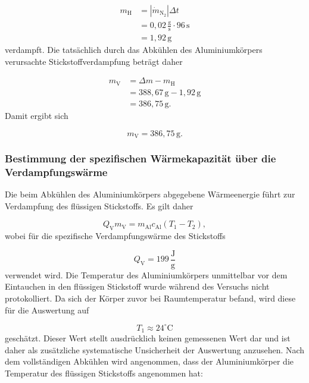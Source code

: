 \documentclass{report}
\begin{document}
\begin{align}
m_\mathrm{H}
&=
\left|\dot m_\mathrm{N_2}\right|\Delta t\\
&=
0{,}02\,\mathrm{\frac{g}{s}}
\cdot96\,\mathrm{s}\\
&=
1{,}92\,\mathrm{g}
\end{align}
\noindent
verdampft.
\noindent
Die tatsächlich durch das Abkühlen des Aluminiumkörpers verursachte
Stickstoffverdampfung beträgt daher

\begin{align}
m_\mathrm{V}
&=
\Delta m-m_\mathrm{H}\\
&=
388{,}67\,\mathrm{g}
-
1{,}92\,\mathrm{g}\\
&=
386{,}75\,\mathrm{g}.
\end{align}
\noindent
Damit ergibt sich

\begin{equation}
\boxed{
m_\mathrm{V}=386{,}75\,\mathrm{g}
}.
\end{equation}


\subsubsection{Bestimmung der spezifischen Wärmekapazität über die Verdampfungswärme}
\noindent
Die beim Abkühlen des Aluminiumkörpers abgegebene Wärmeenergie führt zur
Verdampfung des flüssigen Stickstoffs. Es gilt daher

\begin{equation}
Q_\mathrm{V}m_\mathrm{V}
=
m_\mathrm{Al}c_\mathrm{Al}
\left(T_1-T_2\right),
\end{equation}
\noindent
wobei für die spezifische Verdampfungswärme des Stickstoffs

\begin{equation}
Q_\mathrm{V}
=
199\,\frac{\mathrm{J}}{\mathrm{g}}
\end{equation}
\noindent
verwendet wird.
\noindent
Die Temperatur des Aluminiumkörpers unmittelbar vor dem Eintauchen in den
flüssigen Stickstoff wurde während des Versuchs nicht protokolliert. Da sich der
Körper zuvor bei Raumtemperatur befand, wird diese für die Auswertung auf

\begin{equation}
\boxed{
T_1\approx24^\circ\mathrm{C}
}
\end{equation}
\noindent
geschätzt.
\noindent
Dieser Wert stellt ausdrücklich keinen gemessenen Wert dar und ist daher als
zusätzliche systematische Unsicherheit der Auswertung anzusehen.
\noindent
Nach dem vollständigen Abkühlen wird angenommen, dass der Aluminiumkörper die
Temperatur des flüssigen Stickstoffs angenommen hat:
\end{document}
